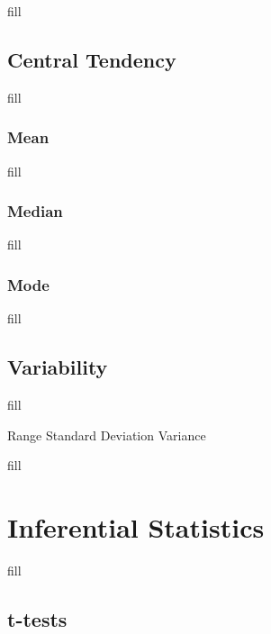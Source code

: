 \documentclass[
  b5paper]{book}
\begin{document}
fill

\hypertarget{central-tendency}{%
\subsection*{Central Tendency}\label{central-tendency}}

fill

\hypertarget{mean}{%
\subsubsection*{Mean}\label{mean}}

fill

\hypertarget{median}{%
\subsubsection*{Median}\label{median}}

fill

\hypertarget{mode}{%
\subsubsection*{Mode}\label{mode}}

fill

\hypertarget{variability}{%
\subsection*{Variability}\label{variability}}

fill

Range Standard Deviation Variance

fill

\hypertarget{inferential-statistics-1}{%
\section{Inferential Statistics}\label{inferential-statistics-1}}

fill

\hypertarget{t-tests}{%
\subsection*{t-tests}\label{t-tests}}
\end{document}
